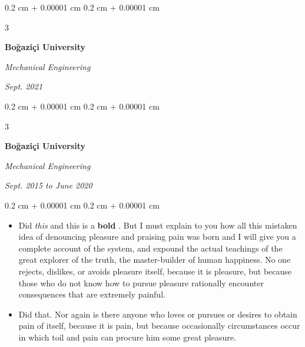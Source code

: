 \documentclass[10pt, letterpaper]{article}
\newenvironment{highlights}{
    \begin{itemize}[
        topsep=0.10 cm,
        parsep=0.10 cm,
        partopsep=0pt,
        itemsep=0pt,
        leftmargin=0.4 cm + 10pt + 0.6 cm
    ]
}{
    \end{itemize}
} %
\newenvironment{onecolentry}{
    \begin{adjustwidth}{
        0.2 cm + 0.00001 cm
    }{
        0.2 cm + 0.00001 cm
    }
}{
    \end{adjustwidth}
} %
\newenvironment{threecolentry}[3][]{
    \onecolentry
    \def\thirdColumn{#3}
    \setcolumnwidth{0.6 cm, \fill, 4.5 cm}
    \begin{paracol}{3}
    #2 \switchcolumn
}{
    \switchcolumn \raggedleft \thirdColumn
    \end{paracol}
    \endonecolentry
} %
\let\hrefWithoutArrow\href
\renewcommand{\href}[2]{\hrefWithoutArrow{#1}{\mbox{\ifthenelse{\equal{#2}{}}{ }{#2 }\raisebox{.15ex}{\footnotesize \faExternalLink*}}}}
\begin{document}
        \vspace{0.2 cm-3px}

        \begin{threecolentry}{
            \vspace*{\fill}
            \textbullet
            \vspace*{3px}
            \vspace*{\fill}
        }{
            
            
        \textit{Sept. 2021}}
            \textbf{Boğaziçi University}

            \textit{Mechanical Engineering}
        \end{threecolentry}



        \vspace{0.2 cm-3px}

        \begin{threecolentry}{
            \vspace*{\fill}
            \textbullet
            \vspace*{3px}
            \vspace*{\fill}
        }{
            
            
        \textit{Sept. 2015 to June 2020}}
            \textbf{Boğaziçi University}

            \textit{Mechanical Engineering}
        \end{threecolentry}

        \vspace{0.10 cm-3px}
        \begin{onecolentry}
            \begin{highlights}
                \item Did \textit{this} and this is a \textbf{bold} \href{https://example.com}{link}. But I must explain to you how all this mistaken idea of denouncing pleasure and praising pain was born and I will give you a complete account of the system, and expound the actual teachings of the great explorer of the truth, the master-builder of human happiness. No one rejects, dislikes, or avoids pleasure itself, because it is pleasure, but because those who do not know how to pursue pleasure rationally encounter consequences that are extremely painful.
                \item Did that. Nor again is there anyone who loves or pursues or desires to obtain pain of itself, because it is pain, but because occasionally circumstances occur in which toil and pain can procure him some great pleasure.
            \end{highlights}
        \end{onecolentry}
\end{document}

